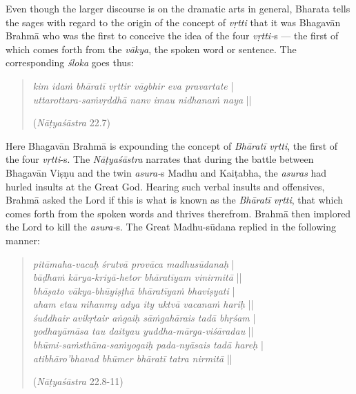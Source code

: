 Even though the larger discourse is on the dramatic arts in general, Bharata tells the sages with regard to the origin of the concept of \textsl{vṛtti} that it was Bhagavān Brahmā who was the first to conceive the idea of the four \textsl{vṛtti-}s --- the first of which comes forth from the \textsl{vākya}, the spoken word or sentence. The corresponding \textsl{śloka} goes thus:
\begin{quote}
\textsl{kim idaṁ bhāratī vṛttir vāgbhir eva pravartate} |  \\
\textsl{uttarottara-saṁvṛddhā nanv imau nidhanaṁ naya} || 

\hfill(\textsl{Nāṭyaśāstra} 22.7)
\end{quote}

Here Bhagavān Brahmā is expounding the concept of \textsl{Bhāratī vṛtti}, the first of the four \textsl{vṛtti}-s. The \textsl{Nāṭyaśāstra} narrates that during the battle between Bhagavān Viṣṇu and the twin \textsl{asura-}s Madhu and Kaiṭabha, the \textsl{asuras} had hurled insults at the Great God. Hearing such verbal insults and offensives, Brahmā asked the Lord if this is what is known as the \textsl{Bhāratī vṛtti}, that which comes forth from the spoken words and thrives therefrom. Brahmā then implored the Lord to kill the \textsl{asura-}s. The Great Madhu-sūdana replied in the following manner:
\begin{quote}
\textsl{pitāmaha-vacaḥ śrutvā provāca madhusūdanaḥ} |\\
\textsl{bāḍhaṁ kārya-kriyā-hetor bhāratīyam vinirmitā} ||\\
\textsl{bhāṣato vākya-bhūyiṣṭhā bhāratīyaṁ bhaviṣyati} |\\
\textsl{aham etau nihanmy adya ity uktvā vacanaṁ hariḥ} ||\\
\textsl{śuddhair avikṛtair aṅgaiḥ sāṁgahārais tadā bhṛśam} |\\
\textsl{yodhayāmāsa tau daityau yuddha-mārga-viśāradau} ||\\
\textsl{bhūmi-saṁsthāna-saṁyogaiḥ pada-nyāsais tadā hareḥ} |\\
\textsl{atibhāro’bhavad bhūmer bhāratī tatra nirmitā} ||

\hfill (\textsl{Nāṭyaśāstra} 22.8-11)
\end{quote}


